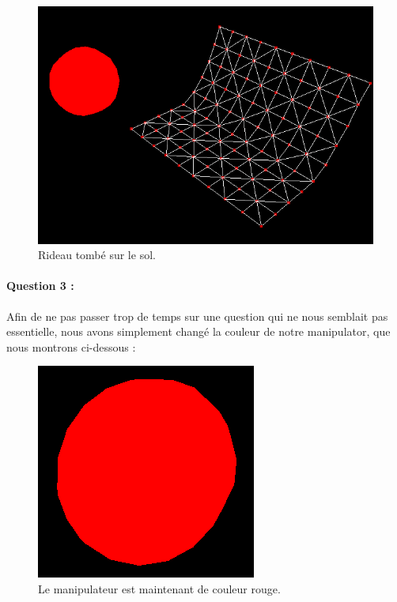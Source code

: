 \documentclass[a4paper,12pt]{article}
\begin{document}
\begin{figure}[ht!]
  \centering
  \includegraphics[width=\textwidth]{images/sol_image.png}
  \caption{Rideau tombé sur le sol.}
  \label{fig:floor}
\end{figure}

\paragraph{Question 3 :} Afin de ne pas passer trop de temps sur une question qui ne nous semblait pas essentielle, nous avons simplement changé la couleur de notre manipulator, que nous montrons ci-dessous :
\begin{figure}[ht!]
  \centering
  \includegraphics{images/manipulateur.png}
  \caption{Le manipulateur est maintenant de couleur rouge.}
  \label{fig:custom}
\end{figure}
\end{document}
